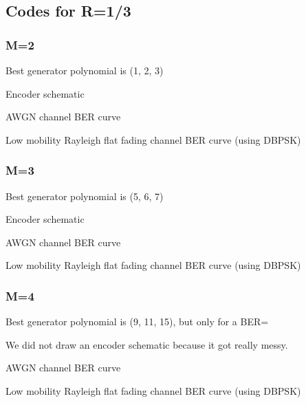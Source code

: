 \documentclass[a4paper,10pt]{article}
\begin{document}
\subsection{Codes for R=1/3}

\subsubsection{M=2}

\begin{outline}
  \item Best generator polynomial is (1, 2, 3)

  \item Encoder schematic

  \item AWGN channel BER curve

  \item Low mobility Rayleigh flat fading channel BER curve (using DBPSK)
\end{outline}


\subsubsection{M=3}

\begin{outline}
  \item Best generator polynomial is (5, 6, 7)

  \item Encoder schematic

  \item AWGN channel BER curve

  \item Low mobility Rayleigh flat fading channel BER curve (using DBPSK)
\end{outline}

\subsubsection{M=4}

\begin{outline}
  \item Best generator polynomial is (9, 11, 15), but only for a BER=\ber

  \item We did not draw an encoder schematic because it got really messy.

  \item AWGN channel BER curve

  \item Low mobility Rayleigh flat fading channel BER curve (using DBPSK)
\end{outline}
\end{document}
